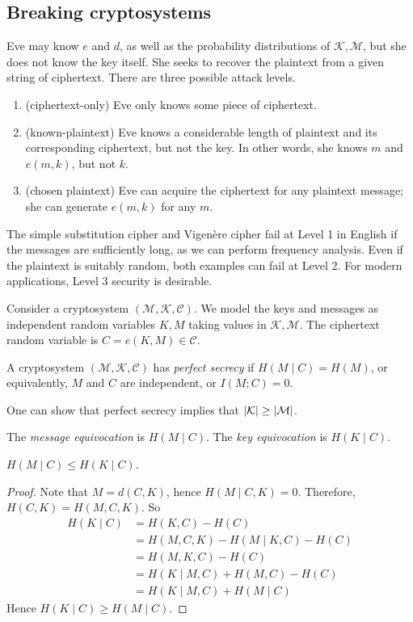 \subsection{Breaking cryptosystems}
Eve may know \( e \) and \( d \), as well as the probability distributions of \( \mathcal K, \mathcal M \), but she does not know the key itself.
She seeks to recover the plaintext from a given string of ciphertext.
There are three possible attack levels.
\begin{enumerate}[1.]
    \item (ciphertext-only) Eve only knows some piece of ciphertext.
    \item (known-plaintext) Eve knows a considerable length of plaintext and its corresponding ciphertext, but not the key.
    In other words, she knows \( m \) and \( e(m,k) \), but not \( k \).
    \item (chosen plaintext) Eve can acquire the ciphertext for any plaintext message; she can generate \( e(m,k) \) for any \( m \).
\end{enumerate}
\begin{remark}
    The simple substitution cipher and Vigen\`ere cipher fail at Level 1 in English if the messages are sufficiently long, as we can perform frequency analysis.
    Even if the plaintext is suitably random, both examples can fail at Level 2.
    For modern applications, Level 3 security is desirable.
\end{remark}
Consider a cryptosystem \( (\mathcal M, \mathcal K, \mathcal C) \).
We model the keys and messages as independent random variables \( K, M \) taking values in \( \mathcal K, \mathcal M \).
The ciphertext random variable is \( C = e(K,M) \in \mathcal C \).
\begin{definition}
    A cryptosystem \( (\mathcal M, \mathcal K, \mathcal C) \) has \emph{perfect secrecy} if \( H(M \mid C) = H(M) \), or equivalently, \( M \) and \( C \) are independent, or \( I(M;C) = 0 \).
\end{definition}
One can show that perfect secrecy implies that \( \abs{\mathcal K} \geq \abs{\mathcal M} \).
\begin{definition}
    The \emph{message equivocation} is \( H(M \mid C) \).
    The \emph{key equivocation} is \( H(K \mid C) \).
\end{definition}
\begin{lemma}
    \( H(M \mid C) \leq H(K \mid C) \).
\end{lemma}
\begin{proof}
    Note that \( M = d(C,K) \), hence \( H(M \mid C, K) = 0 \).
    Therefore, \( H(C,K) = H(M,C,K) \).
    So
    \begin{align*}
        H(K \mid C) &= H(K,C) - H(C) \\
        &= H(M,C,K) - H(M \mid K,C) - H(C) \\
        &= H(M,K,C) - H(C) \\
        &= H(K \mid M,C) + H(M,C) - H(C) \\
        &= H(K \mid M, C) + H(M \mid C)
    \end{align*}
    Hence \( H(K \mid C) \geq H(M \mid C) \).
\end{proof}
